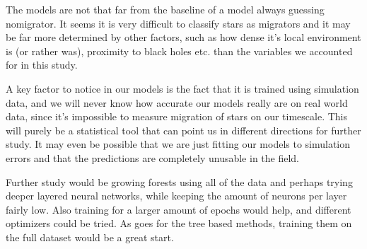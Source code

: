 The models are not that far from the baseline of a model always guessing nomigrator. It seems it is very difficult to classify stars as migrators and it may be far more determined by other factors, such as how dense it's local environment is (or rather was), proximity to black holes etc. than the variables we accounted for in this study. 

A key factor to notice in our models is the fact that it is trained using simulation data, and we will never know how accurate our models really are on real world data, since it's impossible to measure migration of stars on our timescale. This will purely be a statistical tool that can point us in different directions for further study. It may even be possible that we are just fitting our models to simulation errors and that the predictions are completely unusable in the field.

Further study would be growing forests using all of the data and perhaps trying deeper layered neural networks, while keeping the amount of neurons per layer fairly low. Also training for a larger amount of epochs would help, and different optimizers could be tried. As goes for the tree based methods, training them on the full dataset would be a great start.